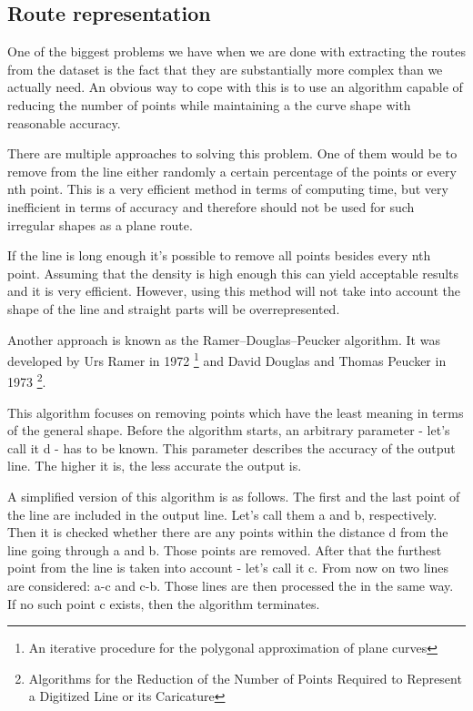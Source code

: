 \documentclass{vldb}
\begin{document}
\subsection{Route representation}
One of the biggest problems we have when we are done with extracting 
the routes from the dataset is the fact that they are substantially more 
complex than we actually need. An obvious way to cope with this is to use 
an algorithm capable of reducing the number of points while maintaining 
a the curve shape with reasonable accuracy.

There are multiple approaches to solving this problem.
 One of them would be to remove from the line either randomly a certain 
percentage of the points or every nth point. This is a very efficient method 
in terms of computing time, but very inefficient in terms of accuracy 
and therefore should not be used for such irregular shapes as a plane route.

If the line is long enough it’s possible to remove all points besides every nth point. 
Assuming that the density is high enough this can yield acceptable results and it is 
very efficient. However, using this method will not take into account 
the shape of the line and straight parts will be overrepresented.

Another approach is known as the Ramer–Douglas–Peucker algorithm. 
It was developed by Urs Ramer in 1972
 \footnote{An iterative procedure for the polygonal approximation of plane curves} 
and David Douglas and Thomas Peucker in 1973
 \footnote{Algorithms for the Reduction of the Number of Points Required to Represent a Digitized Line or its Caricature}.

This algorithm focuses on removing points which have the least meaning 
in terms of the general shape. Before the algorithm starts, an arbitrary
 parameter - let’s call it d - has to be known. This parameter describes the 
accuracy of the output line. The higher it is, the less accurate the output is.

A simplified version of this algorithm is as follows. 
The first and the last point of the line are included in the output line. 
Let’s call them a and b, respectively. Then it is checked whether there are 
any points within the distance d from the line going through a and b. 
Those points are removed. After that the furthest point from the line is 
taken into account - let’s call it c. From now on two lines are considered: a-c and c-b. 
Those lines are then processed the in the same way. 
If no such point c exists, then the algorithm terminates.
\end{document}
